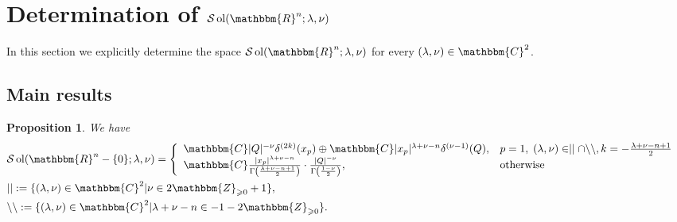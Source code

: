\documentclass{article}
\newcommand{\assign}{:=}
\newcommand{\tmop}[1]{\ensuremath{\operatorname{#1}}}
\numberwithin{definition}{section}
\numberwithin{lemma}{section}
\newtheorem{proposition}{Proposition}
\numberwithin{proposition}{section}
{\theorembodyfont{\rmfamily}\newtheorem{remark}{Remark}
\numberwithin{remark}{section}
}
\begin{document}
\section{Determination of $\mathcal{S} \tmop{ol} ( \mathbbm{R}^n ; \lambda,
\nu)$}\label{sec:sol-MO}

In this section we explicitly determine the space $\mathcal{S} \tmop{ol} (
\mathbbm{R}^n ; \lambda, \nu)$ for every $( \lambda, \nu) \in \mathbbm{C}^2$.

\subsection{Main results}

\begin{proposition}
  \label{sol-MO:prop-solonnonzero}We have
  \begin{eqnarray}
    & \mathcal{S} \tmop{ol} ( \mathbbm{R}^n - \{ 0 \} ; \lambda, \nu) =
    \left\{ \begin{array}{ll}
      \mathbbm{C} | Q |^{- \nu} \delta^{( 2 k)} ( x_p) \oplus \mathbbm{C} |
      x_p |^{\lambda + \nu - n} \delta^{( \nu - 1)} ( Q), & p = 1, \; (
      \lambda, \nu) \in \mid \mid \cap \backslash\backslash, k = -
      \frac{\lambda + \nu - n + 1}{2}\\
      \mathbbm{C} \frac{| x_p |^{\lambda + \nu - n}}{\Gamma \left(
      \frac{\lambda + \nu - n + 1}{2} \right)} \cdot \frac{| Q |^{-
      \nu}}{\Gamma \left( \frac{1 - \nu}{2} \right)}, & \tmop{otherwise}
    \end{array} \right. &  \nonumber\\
    & | | \assign \{ ( \lambda, \nu) \in \mathbbm{C}^2 | \nu \in
    2\mathbbm{Z}_{\geqslant 0} + 1 \}, &  \nonumber\\
    & \backslash\backslash \assign \{ ( \lambda, \nu) \in \mathbbm{C}^2 |
    \lambda + \nu - n \in - 1 - 2\mathbbm{Z}_{\geqslant 0} \} . &  \nonumber
  \end{eqnarray}
\end{proposition}
\end{document}
